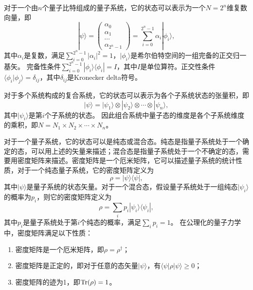对于一个由$n$个量子比特组成的量子系统，它的状态可以表示为一个$N=2^n$维复数向量，即
\begin{equation}
    |\psi\rangle = \begin{pmatrix} \alpha_0 \\ \alpha_1 \\ \cdots \\ \alpha_{2^n-1} \end{pmatrix} = \sum_{i=0}^{2^n-1} \alpha_i|\phi_i\rangle,
\end{equation}
其中$\alpha_i$是复数，满足$\sum_{i=0}^{2^n-1} |\alpha_i|^2 = 1$，$|\phi_i\rangle$是希尔伯特空间的一组完备的正交归一基矢。
完备性条件$\sum_{i=0}^{2^n-1} |\phi_i\rangle\langle\phi_i| = I$，其中$I$是单位算符。正交性条件$\langle\phi_i|\phi_j\rangle = \delta_{ij}$，其中$\delta_{ij}$是Kronecker delta符号。


对于多个系统构成的复合系统，它的状态可以表示为各个子系统状态的张量积，即
\begin{equation}
    |\psi\rangle = |\psi_1\rangle \otimes |\psi_2\rangle \otimes \cdots \otimes |\psi_n\rangle,
\end{equation}
其中$|\psi_i\rangle$是第$i$个子系统的状态。
因此组合系统中量子态的维度是各个子系统维度的乘积，即$N = N_1 \times N_2 \times \cdots \times N_n$。

对于一个量子系统，它的状态可以是纯态或混合态。纯态是指量子系统处于一个确定的态，可以用上述的矢量来描述；混合态是指量子系统处于一个不确定的态，需要用密度矩阵来描述。密度矩阵是一个厄米矩阵，它可以描述量子系统的统计性质，对于一个纯态量子系统，它的密度矩阵定义为
\begin{equation}
    \rho = |\psi\rangle\langle\psi|,
\end{equation}
其中$|\psi\rangle$是量子系统的状态矢量。对于一个混合态，假设量子系统处于一组纯态$|\psi_i\rangle$的概率为$p_i$，则它的密度矩阵定义为
\begin{equation}
    \rho = \sum_i p_i |\psi_i\rangle\langle\psi_i|,
\end{equation}
其中$p_i$是量子系统处于第$i$个纯态的概率，满足$\sum_i p_i = 1$。
在公理化的量子力学中，密度矩阵满足以下性质：
\begin{enumerate}
    \item 密度矩阵是一个厄米矩阵，即$\rho = \rho^\dagger$；
    \item 密度矩阵是正定的，即对于任意的态矢量$|\psi\rangle$，有$\langle\psi|\rho|\psi\rangle \geq 0$；
    \item 密度矩阵的迹为1，即$\Tr(\rho) = 1$。
\end{enumerate}


